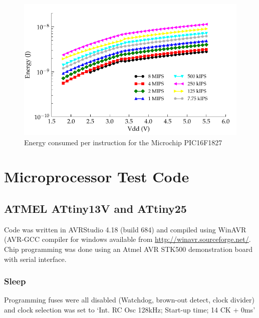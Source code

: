 \begin{figure}
\begin{centering}
\includegraphics{content/appendices/microprocessorPowerMeasurements/graphics/Graph_PIC16F1827_Clock_JPI}
\par\end{centering}

\protect\caption{
\label{fig:16F1827ClkJPI}Energy consumed per instruction for the
Microchip PIC16F1827
}


\end{figure}



\section{Microprocessor Test Code}


\subsection{ATMEL ATtiny13V and ATtiny25}

Code was written in AVRStudio 4.18 (build 684) and compiled using
WinAVR (AVR-GCC compiler for windows available from \url{http://winavr.sourceforge.net/}.
Chip programming was done using an Atmel AVR STK500 demonstration
board with serial interface.


\subsubsection{Sleep}

Programming fuses were all disabled (Watchdog, brown-out detect, clock
divider) and clock selection was set to `Int. RC Osc 128kHz; Start-up
time; 14 CK + 0ms'


